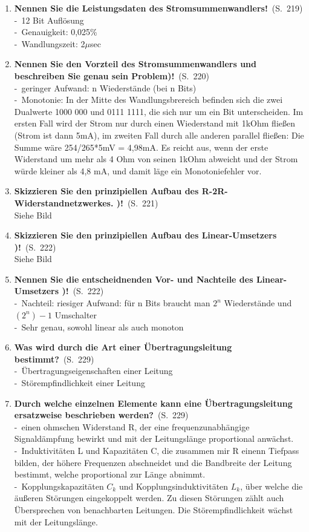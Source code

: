 \documentclass[a4paper,12pt]{article}
\newcommand{\question}[3]{\pagebreak[3]\item {\textbf{#1?}}\ (S.\ #2)#3}
\newcommand{\statement}[3]{\pagebreak[3]\item {\textbf{#1!}}\ (S.\ #2)#3}
\newcommand{\catchword}[1]{\\-\ #1}
\newcommand{\normaltext}[1]{\\#1}
\newcommand{\page}[1]{#1}
\begin{document}
\begin{enumerate}
  \statement{Nennen Sie die Leistungsdaten des Stromsummenwandlers}{\page{219}}
  {
    \catchword{12 Bit Auflösung}
    \catchword{Genauigkeit: 0,025\%}
    \catchword{Wandlungszeit: 2$\mu$sec}
  }

  \statement{Nennen Sie den Vorzteil des Stromsummenwandlers und beschreiben Sie
             genau sein Problem)}{\page{220}}
  {
    \catchword{geringer Aufwand: n Wiederstände (bei n Bits)}
    \catchword{Monotonie: In der Mitte des Wandlungsbrereich befinden sich die zwei Dualwerte 1000 000
               und 0111 1111, die sich nur um ein Bit unterscheiden. Im ersten Fall wird der Strom nur
               durch einen Wiederstand mit 1kOhm fließen (Strom ist dann 5mA), im zweiten Fall durch alle
               anderen parallel fließen: Die Summe wäre 254/265*5mV = 4,98mA. Es reicht aus, wenn der erste
               Widerstand um mehr als 4 Ohm von seinen 1kOhm abweicht und der Strom würde kleiner als 4,8 mA,
               und damit läge ein Monotoniefehler vor.}
  }

  \statement{Skizzieren Sie den prinzipiellen Aufbau des R-2R-Widerstandnetzwerkes. )}{\page{221}}
  {
    \normaltext{Siehe Bild}
  }

  \statement{Skizzieren Sie den prinzipiellen Aufbau des Linear-Umsetzers )}{\page{222}}
  {
    \normaltext{Siehe Bild}
  }

  \statement{Nennen Sie die entscheidnenden Vor- und Nachteile des Linear-Umsetzers )}{\page{222}}
  {
    \catchword{Nachteil: riesiger Aufwand: für n Bits braucht man $2^n$ Wiederstände und $(2^n)-1$ Umschalter}
    \catchword{Sehr genau, sowohl linear als auch monoton}
  }

 \question{Was wird durch die Art einer Übertragungsleitung bestimmt}{\page{229}}
  {
    \catchword{Übertragungseigenschaften einer Leitung}
    \catchword{Störempfindlichkeit einer Leitung}
  }

  \question{Durch welche einzelnen Elemente kann eine Übertragungsleitung ersatzweise
            beschrieben werden}{\page{229}}
  {
    \catchword{einen ohmschen Widerstand R, der eine frequenzunabhängige Signaldämpfung bewirkt und
    mit der Leitungslänge proportional anwächst.}
    \catchword{Induktivitäten L und Kapazitäten C, die zusammen mir R einenn Tiefpass bilden, der höhere
    Frequenzen abschneidet und die Bandbreite der Leitung bestimmt, welche proportional zur Länge abnimmt.}
    \catchword{Kopplungskapazitäten $C_k$ und Kopplungsinduktivitäten $L_k$, über welche die äußeren Störungen
    eingekoppelt werden. Zu diesen Störungen zählt auch Übersprechen von benachbarten Leitungen. Die
    Störempfindlichkeit wächst mit der Leitungslänge.}
  }


\end{enumerate}
\end{document}
